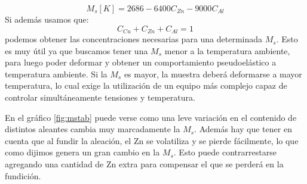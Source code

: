 \documentclass[a4paper,12pt,fleqn,twoside,openany]{book}
\begin{document}
\begin{equation}
M_s[K]=2686-6400C_{Zn}-9000C_{Al} \label{Ms} 
\end{equation}
Si además usamos que:
\begin{equation}
     C_{Cu}+C_{Zn}+C_{Al}=1
\end{equation}
podemos obtener las concentraciones necesarias para una determinada $M_{s}$. Esto es muy útil ya que buscamos tener una $M_{s}$ menor a la temperatura ambiente, para 
luego poder deformar y obtener un comportamiento pseudoelástico a temperatura ambiente. Si la $M_{s}$ es mayor, la muestra deberá deformarse a mayor temperatura, lo 
cual exige la utilización de un equipo más complejo capaz de controlar simultáneamente tensiones y temperatura.



En el gráfico \ref{fig:mstab} puede verse como una leve variación en el contenido de distintos aleantes cambia muy marcadamente la $M_s$. Además hay que 
tener en cuenta que al fundir la aleación, el Zn se volatiliza y se pierde fácilmente, lo que como dijimos genera un gran cambio en la $M_s$. Esto 
puede contrarrestarse agregando una cantidad de Zn extra para compensar el que se perderá en la fundición.

\end{document}
